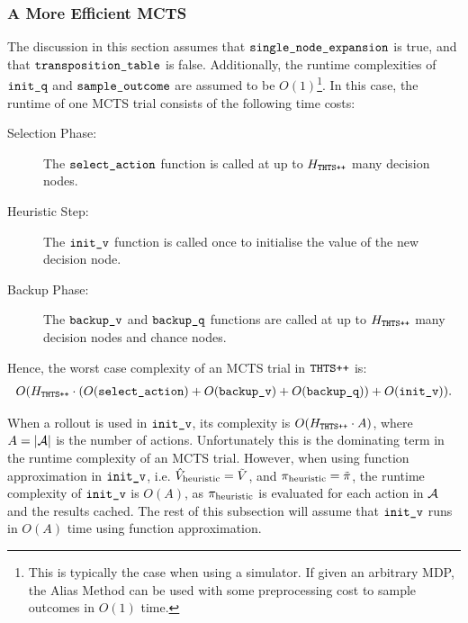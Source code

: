 \subsubsection{A More Efficient MCTS}
\label{sec:4-2-3-2-alias_method}

    \newcommand{\old}{{\text{prev}}}
    \newcommand{\Qcorrected}{{S}}

    The discussion in this section assumes that ${\textnormal{\texttt{single\_node\_expansion}}}$ is true, and that ${\textnormal{\texttt{transposition\_table}}}$ is false. Additionally, the runtime complexities of ${\textnormal{\texttt{init\_q}}}$ and ${\textnormal{\texttt{sample\_outcome}}}$ are assumed to be $O(1)$\footnote{This is typically the case when using a simulator. If given an arbitrary MDP, the Alias Method can be used with some preprocessing cost to sample outcomes in $O(1)$ time.}. In this case, the runtime of one MCTS trial consists of the following time costs:
    \begin{description}
        \item[Selection Phase:] 
            The ${\textnormal{\texttt{select\_action}}}$ function is called at up to $H_{{\textnormal{\texttt{THTS++}}}}$ many decision nodes.
        \item[Heuristic Step:] 
            The ${\textnormal{\texttt{init\_v}}}$ function is called once to initialise the value of the new decision node.
        \item[Backup Phase:]
            The ${\textnormal{\texttt{backup\_v}}}$ and ${\textnormal{\texttt{backup\_q}}}$ functions are called at up to $H_{{\textnormal{\texttt{THTS++}}}}$ many decision nodes and chance nodes.
    \end{description}

    Hence, the worst case complexity of an MCTS trial in ${\textnormal{\texttt{THTS++}}}$ is:
    \begin{align}
        O(H_{{\textnormal{\texttt{THTS++}}}}\cdot \left(O({\textnormal{\texttt{select\_action}}})+O({\textnormal{\texttt{backup\_v}}})+O({\textnormal{\texttt{backup\_q}}})\right)+O({\textnormal{\texttt{init\_v}}})). \label{eq:4:mcts_trial_complexity}
    \end{align}

    When a rollout is used in ${\textnormal{\texttt{init\_v}}}$, its complexity is $O(H_{{\textnormal{\texttt{THTS++}}}}\cdot A)$, where $A=|\mathcal{A}|$ is the number of actions. Unfortunately this is the dominating term in the runtime complexity of an MCTS trial. However, when using function approximation in ${\textnormal{\texttt{init\_v}}}$, i.e. ${\hat{V}_{\textnormal{heuristic}}}=\tilde{V}$, and ${\pi_{\textnormal{heuristic}}}=\tilde{\pi}$, the runtime complexity of ${\textnormal{\texttt{init\_v}}}$ is $O(A)$, as ${\pi_{\textnormal{heuristic}}}$ is evaluated for each action in $\mathcal{A}$ and the results cached. The rest of this subsection will assume that ${\textnormal{\texttt{init\_v}}}$ runs in $O(A)$ time using function approximation.

